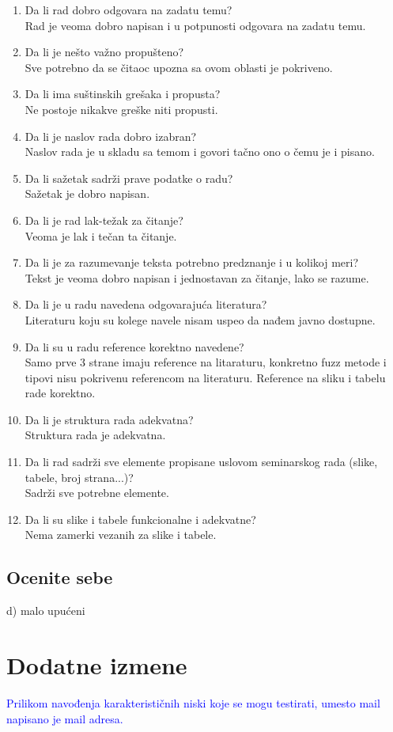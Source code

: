 \documentclass[a4paper]{report}
\newcommand{\odgovor}[1]{\textcolor{blue}{#1}}
\begin{document}
\begin{enumerate}
\item Da li rad dobro odgovara na zadatu temu?\\
Rad je veoma dobro napisan i u potpunosti odgovara na zadatu temu.
\item Da li je nešto važno propušteno?\\
Sve potrebno da se čitaoc upozna sa ovom oblasti je pokriveno.
\item Da li ima suštinskih grešaka i propusta?\\
Ne postoje nikakve greške niti propusti.
\item Da li je naslov rada dobro izabran?\\
Naslov rada je u skladu sa temom i govori tačno ono o čemu je i pisano.
\item Da li sažetak sadrži prave podatke o radu?\\
Sažetak je dobro napisan.
\item Da li je rad lak-težak za čitanje?\\
Veoma je lak i tečan ta čitanje.
\item Da li je za razumevanje teksta potrebno predznanje i u kolikoj meri?\\
Tekst je veoma dobro napisan i jednostavan za čitanje, lako se razume.
\item Da li je u radu navedena odgovarajuća literatura?\\
Literaturu koju su kolege navele nisam uspeo da nađem javno dostupne. 
\item Da li su u radu reference korektno navedene?\\
Samo prve 3 strane imaju reference na litaraturu, konkretno fuzz metode i tipovi nisu pokrivenu referencom na literaturu. Reference na sliku i tabelu rade korektno.
\item Da li je struktura rada adekvatna?\\
Struktura rada je adekvatna.
\item Da li rad sadrži sve elemente propisane uslovom seminarskog rada (slike, tabele, broj strana...)?\\
Sadrži sve potrebne elemente.
\item Da li su slike i tabele funkcionalne i adekvatne?\\
Nema zamerki vezanih za slike i tabele.
\end{enumerate}

\section{Ocenite sebe}
 d) malo upućeni 


\chapter{Dodatne izmene}
\odgovor{
Prilikom navođenja karakterističnih niski koje se mogu testirati, umesto mail napisano je mail adresa.
}
\end{document}
